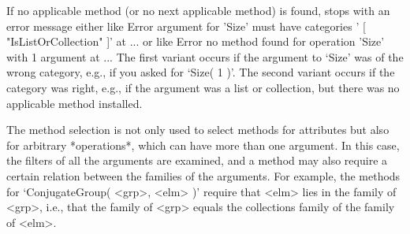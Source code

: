 If no applicable method  (or no next applicable  method) is found, {\GAP}
stops with an error message either like
\begintt
    Error argument for 'Size' must have categories '
    [ "IsListOrCollection" ]' at ...
\endtt
or like
\begintt
    Error no method found for operation 'Size' with 1 argument at ...
\endtt
The  first variant occurs  if  the argument  to  `Size' was  of the wrong
category, e.g.,  if you asked for `Size(  1 )'. The second variant occurs
if the category was    right,  e.g., if   the  argument  was a list    or
collection, but there was no applicable method installed.

%
\danger The method  selection  is not only   used to select  methods  for
attributes but also for arbitrary  *operations*, which can have more than
one   argument.  In this case,   the  filters of  all  the  arguments are
examined, and a  method may also  require a certain  relation between the
families of the arguments. For example,  the methods for `ConjugateGroup(
<grp>, <elm> )'  require that <elm> lies  in the  family of <grp>,  i.e.,
that the family of  <grp> equals the  collections family of the family of
<elm>.

